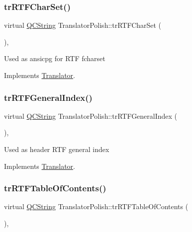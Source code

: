 \subsubsection{\texorpdfstring{trRTFCharSet()}{trRTFCharSet()}}
{\footnotesize\ttfamily virtual \mbox{\hyperlink{class_q_c_string}{Q\+C\+String}} Translator\+Polish\+::tr\+R\+T\+F\+Char\+Set (\begin{DoxyParamCaption}{ }\end{DoxyParamCaption})\hspace{0.3cm}{\ttfamily [inline]}, {\ttfamily [virtual]}}

Used as ansicpg for R\+TF fcharset 

Implements \mbox{\hyperlink{class_translator_afad391f3cbfb5ce6332b7239f8e2049a}{Translator}}.

\mbox{\label{class_translator_polish_a0f9d8838e315e50c6d7c0eaa2ac6b6eb}} 
\subsubsection{\texorpdfstring{trRTFGeneralIndex()}{trRTFGeneralIndex()}}
{\footnotesize\ttfamily virtual \mbox{\hyperlink{class_q_c_string}{Q\+C\+String}} Translator\+Polish\+::tr\+R\+T\+F\+General\+Index (\begin{DoxyParamCaption}{ }\end{DoxyParamCaption})\hspace{0.3cm}{\ttfamily [inline]}, {\ttfamily [virtual]}}

Used as header R\+TF general index 

Implements \mbox{\hyperlink{class_translator}{Translator}}.

\mbox{\label{class_translator_polish_af4e57021ac2b8b4264276039c9134038}} 
\subsubsection{\texorpdfstring{trRTFTableOfContents()}{trRTFTableOfContents()}}
{\footnotesize\ttfamily virtual \mbox{\hyperlink{class_q_c_string}{Q\+C\+String}} Translator\+Polish\+::tr\+R\+T\+F\+Table\+Of\+Contents (\begin{DoxyParamCaption}{ }\end{DoxyParamCaption})\hspace{0.3cm}{\ttfamily [inline]}, {\ttfamily [virtual]}}


